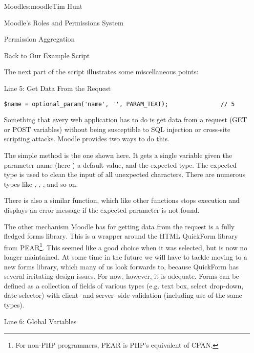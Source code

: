 \begin{aosachapter}{Moodle}{s:moodle}{Tim Hunt}
\begin{aosasect1}{Moodle's Roles and Permissions System}
\begin{aosasect2}{Permission Aggregation}
\end{aosasect2}

\end{aosasect1}

\begin{aosasect1}{Back to Our Example Script}

The next part of the script illustrates some miscellaneous points:

\begin{aosasect2}{Line 5: Get Data From the Request}

\begin{verbatim}
$name = optional_param('name', '', PARAM_TEXT);               // 5
\end{verbatim}

Something that every web application has to do is get data from a
request (GET or POST variables) without being susceptible to SQL
injection or cross-site scripting attacks. Moodle provides two ways to
do this.

The simple method is the one shown here. It gets a single variable
given the parameter name (here ) a default value, and the
expected type. The expected type is used to clean the input of all
unexpected characters. There are numerous types like
, , , and so
on.

There is also a similar  function, which like
other  functions stops execution and displays
an error message if the expected parameter is not found.

The other mechanism Moodle has for getting data from the request is a
fully fledged forms library. This is a wrapper around the HTML
QuickForm library from PEAR\footnote{For non-PHP programmers, PEAR is
  PHP's equivalent of CPAN.}. This seemed like a good choice when it was
selected, but is now no longer maintained. At some time in the
future we will have to tackle moving to a new forms library, which
many of us look forwards to, because QuickForm has several irritating
design issues. For now, however, it is adequate. Forms can be defined
as a collection of fields of various types (e.g. text box, select
drop-down, date-selector) with client- and server- side validation
(including use of the same  types).

\end{aosasect2}

\begin{aosasect2}{Line 6: Global Variables}


\end{aosasect2}
\end{aosasect1}
\end{aosachapter}

